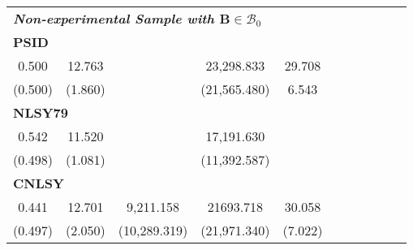 \begin{tabular}{ccccccccccc}
        \multicolumn{10}{l}{\textit{\textbf{Non-experimental Sample with $\bm{B} \in \mathcal{B}_{0}$}}} \\ 
\multicolumn{10}{l}{\textbf{PSID}}\\
    0.500 &    12.763 &     & 23,298.833 &    29.708 &         &         &         &         &         \\  
    (0.500) &     (1.860) &      & (21,565.480) &     6.543 &         &         &         &         &         \\  
\multicolumn{10}{l}{\textbf{NLSY79}} \\
    0.542 &    11.520 &  & 17,191.630 &  &         &         &         &         &         \\  
    (0.498) &     (1.081) &   & (11,392.587) &  &         &         &         &         &         \\
    \multicolumn{10}{l}{\textbf{CNLSY}} \\  
    0.441 &    12.701 &  9,211.158 & 21693.718 &    30.058 &         &         &         &         &         \\  
    (0.497) &     (2.050) & (10,289.319) & (21,971.340) &     (7.022) &         &         &         &         &         \\  \bottomrule \end{tabular}
